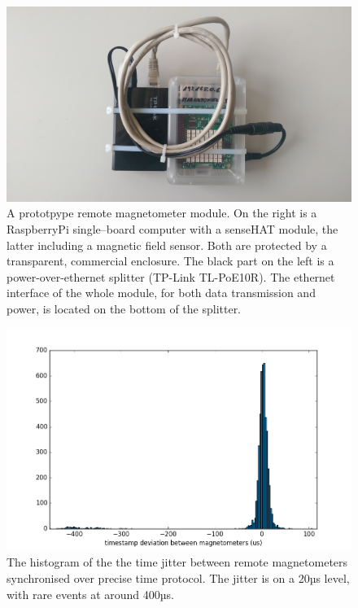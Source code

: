 \begin{figure}
  \centering
  \includegraphics[width=\linewidth]{gfx/nEDM_SFC/remote_magnetometer.jpg}
  \caption{A prototpype remote magnetometer module. On the right is a RaspberryPi single--board computer with a senseHAT module, the latter including a magnetic field sensor. Both are protected by a transparent, commercial enclosure. The black part on the left is a power-over-ethernet splitter (TP-Link TL-PoE10R). The ethernet interface of the whole module, for both data transmission and power, is located on the bottom of the splitter.}
  \label{fig:remote_magnetometers_remote_magnetometer}
\end{figure}

\begin{figure}
  \centering
  \includegraphics[width=\linewidth]{gfx/nEDM_SFC/timing_measurement.png}
  \caption{The histogram of the the time jitter between remote magnetometers synchronised over precise time protocol. The jitter is on a 20µs level, with rare events at around 400µs.}
  \label{fig:remote_magnetometers_timing_measurement}
\end{figure}

